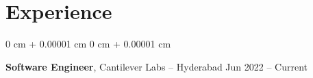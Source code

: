\documentclass[10pt, letterpaper]{article}
\newenvironment{highlightsforbulletentries}{
    \begin{itemize}[
        topsep=0.10 cm,
        parsep=0.10 cm,
        partopsep=0pt,
        itemsep=0pt,
        leftmargin=10pt
    ]
}{
    \end{itemize}
} %
\newenvironment{onecolentry}{
    \begin{adjustwidth}{
        0 cm + 0.00001 cm
    }{
        0 cm + 0.00001 cm
    }
}{
    \end{adjustwidth}
} %
\newenvironment{twocolentry}[2][]{
    \onecolentry
    \def\secondColumn{#2}
    \setcolumnwidth{\fill, 4.5 cm}
    \begin{paracol}{2}
}{
    \switchcolumn \raggedleft \secondColumn
    \end{paracol}
    \endonecolentry
} %
\begin{document}
    








    \section{Experience}



        
        \begin{twocolentry}{
            Jun 2022 – Current
        }
            \textbf{Software Engineer}, Cantilever Labs -- Hyderabad\end{twocolentry}
\end{document}
